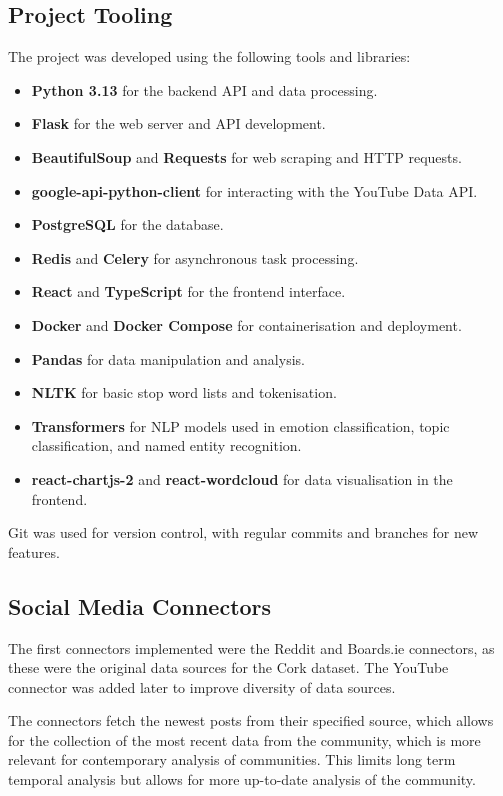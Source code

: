 \documentclass[12pt, a4paper]{article}
\begin{document}
\subsection{Project Tooling}
The project was developed using the following tools and libraries:
\begin{itemize}
    \item \textbf{Python 3.13} for the backend API and data processing.
    \item \textbf{Flask} for the web server and API development.
    \item \textbf{BeautifulSoup} and \textbf{Requests} for web scraping and HTTP requests.
    \item \textbf{google-api-python-client} for interacting with the YouTube Data API.
    \item \textbf{PostgreSQL} for the database.
    \item \textbf{Redis} and \textbf{Celery} for asynchronous task processing.
    \item \textbf{React} and \textbf{TypeScript} for the frontend interface.
    \item \textbf{Docker} and \textbf{Docker Compose} for containerisation and deployment.
    \item \textbf{Pandas} for data manipulation and analysis.
    \item \textbf{NLTK} for basic stop word lists and tokenisation.
    \item \textbf{Transformers} for NLP models used in emotion classification, topic classification, and named entity recognition.
    \item \textbf{react-chartjs-2} and \textbf{react-wordcloud} for data visualisation in the frontend.
\end{itemize}

Git was used for version control, with regular commits and branches for new features.

\subsection{Social Media Connectors}
The first connectors implemented were the Reddit and Boards.ie connectors, as these were the original data sources for the Cork dataset. The YouTube connector was added later to improve diversity of data sources.

The connectors fetch the newest posts from their specified source, which allows for the collection of the most recent data from the community, which is more relevant for contemporary analysis of communities. This limits long term temporal analysis but allows for more up-to-date analysis of the community.
\end{document}
